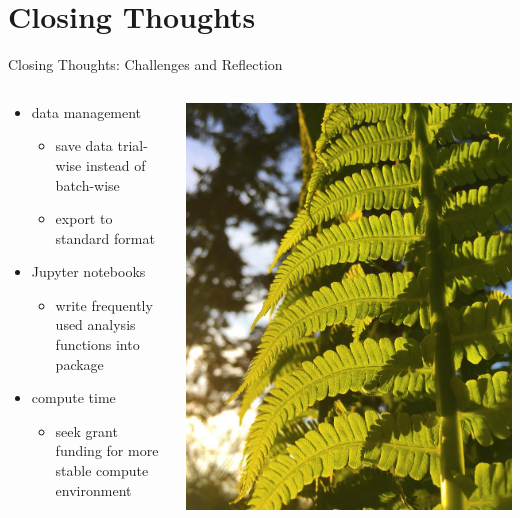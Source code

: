 \section{Closing Thoughts}

\begin{frame}{Closing Thoughts: Challenges and Reflection}
\begin{columns}
\begin{column}{0.6\textwidth}
\begin{itemize}
\item data management
\begin{itemize}
	\item save data trial-wise instead of batch-wise
    \item export to standard format
\end{itemize}
\item Jupyter notebooks
\begin{itemize}
	\item write frequently used analysis functions into package
\end{itemize}
\item compute time
\begin{itemize}
	\item seek grant funding for more stable compute environment
\end{itemize}
\end{itemize}
\end{column}
\begin{column}{0.4\textwidth}
\begin{center}
\includegraphics[width=\textwidth,trim={0cm 0 6cm 0},clip]{img/sunset_fern}

\end{center}
\end{column}
\end{columns}
\end{frame}
